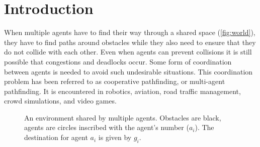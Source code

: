\section{Introduction}\label{sec:intro}
When multiple agents have to find their way through a
shared space (\autoref{fig:world}), they have to find paths
around obstacles while they also need to ensure that they do not collide with
each other. Even when agents can prevent collisions it is still possible
that congestions and deadlocks occur. Some form of coordination between 
agents is needed to avoid such undesirable situations. This coordination problem has been 
referred to as cooperative pathfinding, or multi-agent pathfinding. It is 
encountered in robotics, aviation, road traffic management, crowd simulations, 
and video games.

\begin{figure}[t]
    \centering
    \def\svgscale{.6}
    
    \caption{An environment shared by multiple agents. Obstacles are black,
        agents are circles inscribed with the agent's number ($a_i$). The 
        destination for agent $a_i$ is given by $g_i$.}
    \label{fig:world}
\end{figure}

